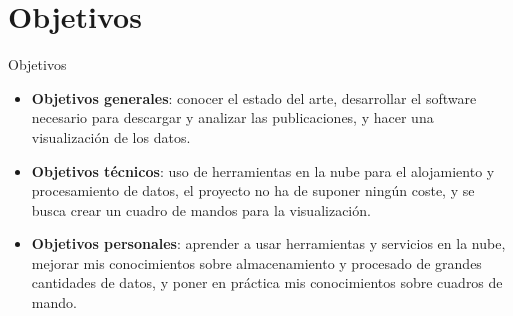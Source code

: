 \documentclass[aspectratio=149]{beamer}
\begin{document}
\section{Objetivos}
\begin{frame}[label=objetivos]{Objetivos}
    \begin{itemize}
        \item \textbf{Objetivos generales}: conocer el estado del arte, desarrollar el software necesario para descargar y analizar las publicaciones, y hacer una visualización de los datos.
        \item \textbf{Objetivos técnicos}: uso de herramientas en la nube para el alojamiento y procesamiento de datos, el proyecto no ha de suponer ningún coste, y se busca crear un cuadro de mandos para la visualización.
        \item \textbf{Objetivos personales}: aprender a usar herramientas y servicios en la nube, mejorar mis conocimientos sobre almacenamiento y procesado de grandes cantidades de datos, y poner en práctica mis conocimientos sobre cuadros de mando.
    \end{itemize}
\end{frame}

\end{document}
